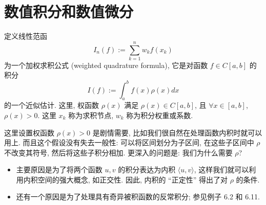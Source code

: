 \documentclass[a4paper]{ctexart}
\newcommand{\hl}[1]
{\noindent {\bf {#1}}}
\begin{document}
{\section{数值积分和数值微分}






\hl{定义 6.1} 定义线性范函 
$$
I_n(f) := \sum_{k = 1}^n w_k f(x_k)
$$
为一个加权求积公式 (weighted quadrature formula), 它是对函数 $f \in C[a, b]$ 的积分
$$
I(f) := \int_a^b f(x) \rho(x) dx
$$
的一个近似估计. 这里, 权函数 $\rho(x)$ 满足 $\rho(x) \in C[a, b]$, 
且 $\forall x \in [a, b]$, $\rho(x) > 0$. 这里 $x_k$ 称为求积节点, $w_k$ 
称为积分权重或系数.

这里设置权函数 $\rho(x) > 0$ 是剧情需要, 比如我们很自然在处理函数内积时就可以用上. 
而且这个假设没有失去一般性: 可以将区间划分为子区间, 在这些子区间中 $\rho$ 不改变其符号, 然后将这些子积分相加. 
更深入的问题是: 我们为什么需要 $\rho$?

\begin{itemize}
  \item 主要原因是为了将两个函数 $u, v$ 的积分表达为内积 $\langle u, v \rangle$, 
  这样我们就可以利用内积空间的强大概念, 如正交性. 因此, 内积的 ``正定性'' 得出了对 $\rho$ 的条件. 
  \item 还有一个原因是为了处理具有奇异被积函数的反常积分; 参见例子 6.2 和 6.11.
\end{itemize}

}
\end{document}
